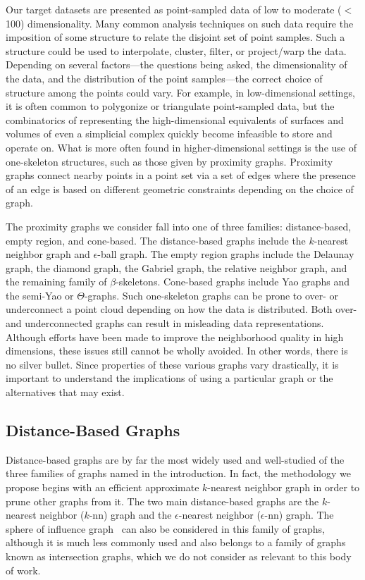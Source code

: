 Our target datasets are presented as point-sampled data of low to moderate ($<$100) dimensionality.
%
Many common analysis techniques on such data require the imposition of some structure to relate the disjoint set of point samples.
%
Such a structure could be used to interpolate, cluster, filter, or project/warp the data.
%
Depending on several factors---the questions being asked, the dimensionality of the data, and the distribution of the point samples---the correct choice of structure among the points could vary.
%
For example, in low-dimensional settings, it is often common to polygonize or triangulate point-sampled data, but the combinatorics of representing the high-dimensional equivalents of surfaces and volumes of even a simplicial complex quickly become infeasible to store and operate on.
%
What is more often found in higher-dimensional settings is the use of one-skeleton structures, such as those given by proximity graphs.
%
Proximity graphs connect nearby points in a point set via a set of edges where the presence of an edge is based on different geometric constraints depending on the choice of graph.

The proximity graphs we consider fall into one of three families: distance-based, empty region, and cone-based.
%
The distance-based graphs include the $k$-nearest neighbor graph and $\epsilon$-ball graph.
%
The empty region graphs include the Delaunay graph, the diamond graph, the Gabriel graph, the relative neighbor graph, and the remaining family of $\beta$-skeletons.
%
Cone-based graphs include Yao graphs and the semi-Yao or $\Theta$-graphs.
%
Such one-skeleton graphs can be prone to over- or underconnect a point cloud depending on how the data is distributed.
%
Both over- and underconnected graphs can result in misleading data representations.
%
Although efforts have been made to improve the neighborhood quality in high dimensions, these issues still cannot be wholly avoided.
%
In other words, there is no silver bullet.
%
Since properties of these various graphs vary drastically, it is important to understand the implications of using a particular graph or the alternatives that may exist.

\subsection{Distance-Based Graphs}
Distance-based graphs are by far the most widely used and well-studied of the three families of graphs named in the introduction.
%
In fact, the methodology we propose begins with an efficient approximate $k$-nearest neighbor graph in order to prune other graphs from it.
%
The two main distance-based graphs are the $k$-nearest neighbor ($k$-nn) graph and the $\epsilon$-nearest neighbor ($\epsilon$-nn) graph.
%
The sphere of influence graph~\cite{Toussaint1988} can also be considered in this family of graphs, although it is much less commonly used and also belongs to a family of graphs known as intersection graphs, which we do not consider as relevant to this body of work.


